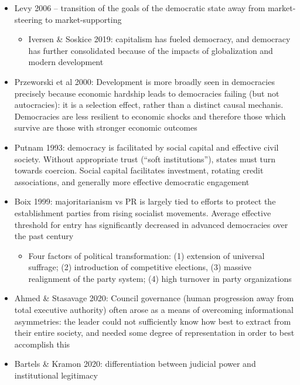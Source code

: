 \documentclass[12pt]{article}
\begin{document}
\begin{itemize}
\begin{itemize}
        \item Ziblatt 2017: If this development does not allow for conservative parties to be meaningfully included in government, then the transition to democracy is likely to be unstable and short-term
    \end{itemize}
    \item Levy 2006 -- transition of the goals of the democratic state away from market-steering to market-supporting
    \begin{itemize}
        \item Iversen \& Soskice 2019: capitalism has fueled democracy, and democracy has further consolidated because of the impacts of globalization and modern development
    \end{itemize}
    \item Przeworski et al 2000: Development is more broadly seen in democracies precisely because economic hardship leads to democracies failing (but not autocracies): it is a selection effect, rather than a distinct causal mechanis. Democracies are less resilient to economic shocks and therefore those which survive are those with stronger economic outcomes
    \item Putnam 1993: democracy is facilitated by social capital and effective civil society. Without appropriate trust (``soft institutions''), states must turn towards coercion. Social capital facilitates investment, rotating credit associations, and generally more effective democratic engagement
    \item Boix 1999: majoritarianism vs PR is largely tied to efforts to protect the establishment parties from rising socialist movements. Average effective threshold for entry has significantly decreased in advanced democracies over the past century
    \begin{itemize}
        \item Four factors of political transformation: (1) extension of universal suffrage; (2) introduction of competitive elections, (3) massive realignment of the party system; (4) high turnover in party organizations
    \end{itemize}
    \item Ahmed \& Stasavage 2020: Council governance (human progression away from total executive authority) often arose as a means of overcoming informational asymmetries: the leader could not sufficiently know how best to extract from their entire society, and needed some degree of representation in order to best accomplish this
    \item Bartels \& Kramon 2020: differentiation between judicial power and institutional legitimacy
\end{itemize}
\end{document}
